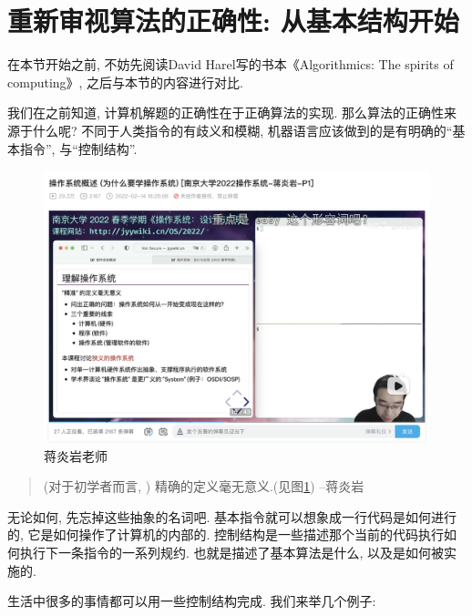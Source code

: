 


\section{重新审视算法的正确性: 从基本结构开始}

\begin{prob}
	在本节开始之前, 不妨先阅读David Harel写的书本《Algorithmics: The spirits of computing》, 之后与本节的内容进行对比. 
\end{prob}


我们在之前知道, 计算机解题的正确性在于正确算法的实现. 那么算法的正确性来源于什么呢? 不同于人类指令的有歧义和模糊, 机器语言应该做到的是有明确的``基本指令'', 与``控制结构''.

\begin{figure}[!htbp]
	\centering
	\includegraphics[scale=0.4]{2-prop-logic/figs/exact-meaningless}
	
	\caption{蒋炎岩老师}
	\label{fig:exact-meaningless}
	\end{figure}


\begin{quote}
	(对于初学者而言, ) 精确的定义毫无意义.(见图\ref{fig:exact-meaningless}) \hfill --蒋炎岩
\end{quote} 

无论如何, 先忘掉这些抽象的名词吧. 基本指令就可以想象成一行代码是如何进行的, 它是如何操作了计算机的内部的. 控制结构是一些描述那个当前的代码执行如何执行下一条指令的一系列规约. 也就是描述了基本算法是什么, 以及是如何被实施的. 


生活中很多的事情都可以用一些控制结构完成. 我们来举几个例子:

